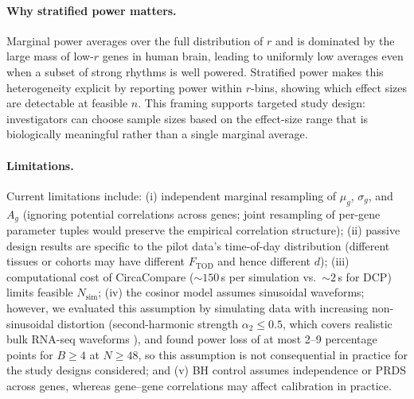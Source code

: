 \documentclass{article}
\begin{document}
\paragraph{Why stratified power matters.} Marginal power averages over the full distribution of $r$ and is dominated by the large mass of low-$r$ genes in human brain, leading to uniformly low averages even when a subset of strong rhythms is well powered. Stratified power makes this heterogeneity explicit by reporting power within $r$-bins, showing which effect sizes are detectable at feasible $n$. This framing supports targeted study design: investigators can choose sample sizes based on the effect-size range that is biologically meaningful rather than a single marginal average.

\paragraph{Limitations.} Current limitations include: (i) independent marginal resampling of $\mu_g$, $\sigma_g$, and $A_g$ (ignoring potential correlations across genes; joint resampling of per-gene parameter tuples would preserve the empirical correlation structure); (ii) passive design results are specific to the pilot data's time-of-day distribution (different tissues or cohorts may have different $F_{\text{TOD}}$ and hence different $d$); (iii) computational cost of CircaCompare (${\sim}150$\,s per simulation vs.\ ${\sim}2$\,s for DCP) limits feasible $N_{\text{sim}}$; (iv) the cosinor model assumes sinusoidal waveforms; however, we evaluated this assumption by simulating data with increasing non-sinusoidal distortion (second-harmonic strength $\alpha_2 \leq 0.5$, which covers realistic bulk RNA-seq waveforms \cite{hughes2009harmonics}), and found power loss of at most 2--9 percentage points for $B \geq 4$ at $N \geq 48$, so this assumption is not consequential in practice for the study designs considered; and (v) BH control assumes independence or PRDS across genes, whereas gene--gene correlations may affect calibration in practice.
\end{document}
